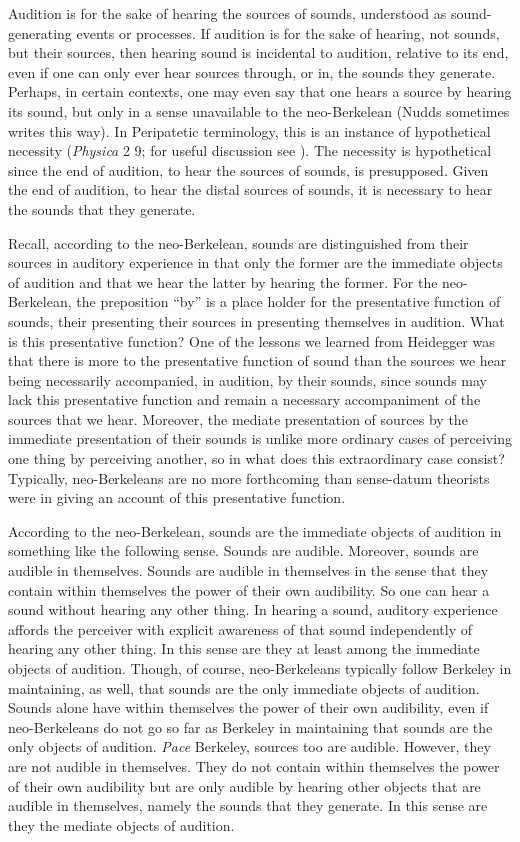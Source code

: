 Audition is for the sake of hearing the sources of sounds, understood as sound-generating events or processes. If audition is for the sake of hearing, not sounds, but their sources, then hearing sound is incidental to audition, relative to its end, even if one can only ever hear sources through, or in, the sounds they generate. Perhaps, in certain contexts, one may even say that one hears a source by hearing its sound, but only in a sense unavailable to the neo-Berkelean (Nudds sometimes writes this way). In Peripatetic terminology, this is an instance of hypothetical necessity (\emph{Physica} 2 9; for useful discussion see \citealt{Charles:1988as}). The necessity is hypothetical since the end of audition, to hear the sources of sounds, is presupposed. Given the end of audition, to hear the distal sources of sounds, it is necessary to hear the sounds that they generate.

Recall, according to the neo-Berkelean, sounds are distinguished from their sources in auditory experience in that only the former are the immediate objects of audition and that we hear the latter by hearing the former. For the neo-Berkelean, the preposition ``by'' is a place holder for the presentative function of sounds, their presenting their sources in presenting themselves in audition. What is this presentative function? One of the lessons we learned from Heidegger was that there is more to the presentative function of sound than the sources we hear being necessarily accompanied, in audition, by their sounds, since sounds may lack this presentative function and remain a necessary accompaniment of the sources that we hear. Moreover, the mediate presentation of sources by the immediate presentation of their sounds is unlike more ordinary cases of perceiving one thing by perceiving another, so in what does this extraordinary case consist? Typically, neo-Berkeleans are no more forthcoming than sense-datum theorists were in giving an account of this presentative function.

According to the neo-Berkelean, sounds are the immediate objects of audition in something like the following sense. Sounds are audible. Moreover, sounds are audible in themselves. Sounds are audible in themselves in the sense that they contain within themselves the power of their own audibility. So one can hear a sound without hearing any other thing. In hearing a sound, auditory experience affords the perceiver with explicit awareness of that sound independently of hearing any other thing. In this sense are they at least among the immediate objects of audition. Though, of course, neo-Berkeleans typically follow Berkeley in maintaining, as well, that sounds are the only immediate objects of audition. Sounds alone have within themselves the power of their own audibility, even if neo-Berkeleans do not go so far as Berkeley in maintaining that sounds are the only objects of audition. \emph{Pace} Berkeley, sources too are audible. However, they are not audible in themselves. They do not contain within themselves the power of their own audibility but are only audible by hearing other objects that are audible in themselves, namely the sounds that they generate. In this sense are they the mediate objects of audition.

